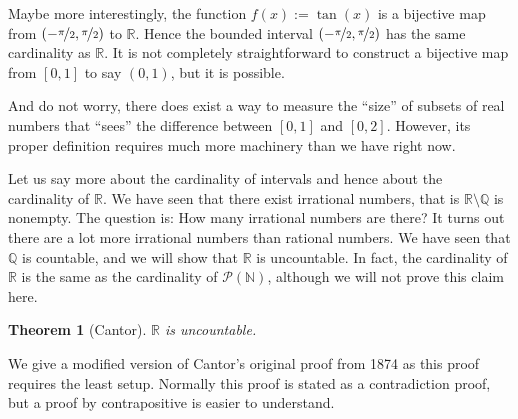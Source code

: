 \documentclass[12pt]{book}
\newcommand{\R}{{\mathbb{R}}}
\newcommand{\N}{{\mathbb{N}}}
\newcommand{\Q}{{\mathbb{Q}}}
\newcommand{\sP}{{\mathcal{P}}}
\theoremstyle{plain}
\newtheorem{thm}{Theorem}[section]
\theoremstyle{remark}
\theoremstyle{definition}
\theoremstyle{exercise}
\theoremstyle{example}
\begin{document}
Maybe more interestingly,
the function $f(x) := \tan(x)$
is a bijective map from $(-\nicefrac{\pi}{2},\nicefrac{\pi}{2})$ to $\R$.  Hence the bounded
interval $(-\nicefrac{\pi}{2},\nicefrac{\pi}{2})$ has the same cardinality as $\R$.  It is not
completely straightforward to construct a bijective map from $[0,1]$ to
say $(0,1)$, but it is possible.

And do not worry, there does exist a way to measure the ``size'' of subsets
of real numbers that
``sees''
the difference between $[0,1]$ and $[0,2]$.  However, its proper definition
requires much more machinery than we have right now.

Let us say more about the cardinality of intervals and hence about the
cardinality of $\R$.  We have seen that there exist irrational numbers, that is
$\R \setminus \Q$ is nonempty.  The question is: How many irrational numbers
are there?  It turns out there are a lot more irrational numbers than rational
numbers.  We have seen that $\Q$ is countable, and we will show 
that $\R$ is uncountable.
In fact, the cardinality of $\R$ is the
same as the cardinality of $\sP(\N)$, although we will not prove this
claim here.

\begin{thm}[Cantor]
$\R$ is uncountable.
\end{thm}

We give a modified version of
Cantor's original proof from
1874 as this proof requires the least setup.  Normally this proof is stated
as a contradiction proof, but a proof by contrapositive is easier to
understand.
\end{document}
